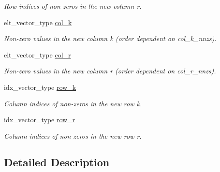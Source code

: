 \begin{DoxyCompactItemize}
\begin{DoxyCompactList}\small\item\em Row indices of non-\/zeros in the new column r. \end{DoxyCompactList}\item 
elt\+\_\+vector\+\_\+type \hyperlink{classswap__struct_a39ab00a67015a67c375b620f54cc6352}{col\+\_\+k}\hypertarget{classswap__struct_a39ab00a67015a67c375b620f54cc6352}{}\label{classswap__struct_a39ab00a67015a67c375b620f54cc6352}

\begin{DoxyCompactList}\small\item\em Non-\/zero values in the new column k (order dependent on col\+\_\+k\+\_\+nnzs). \end{DoxyCompactList}\item 
elt\+\_\+vector\+\_\+type \hyperlink{classswap__struct_a3803a938141694098700de00d5cb6a7d}{col\+\_\+r}\hypertarget{classswap__struct_a3803a938141694098700de00d5cb6a7d}{}\label{classswap__struct_a3803a938141694098700de00d5cb6a7d}

\begin{DoxyCompactList}\small\item\em Non-\/zero values in the new column r (order dependent on col\+\_\+r\+\_\+nnzs). \end{DoxyCompactList}\item 
idx\+\_\+vector\+\_\+type \hyperlink{classswap__struct_a52180e1635646cd4f2dab0209ae62cb9}{row\+\_\+k}\hypertarget{classswap__struct_a52180e1635646cd4f2dab0209ae62cb9}{}\label{classswap__struct_a52180e1635646cd4f2dab0209ae62cb9}

\begin{DoxyCompactList}\small\item\em Column indices of non-\/zeros in the new row k. \end{DoxyCompactList}\item 
idx\+\_\+vector\+\_\+type \hyperlink{classswap__struct_a3b6ad04f7393ddd5c8b130e33208d427}{row\+\_\+r}\hypertarget{classswap__struct_a3b6ad04f7393ddd5c8b130e33208d427}{}\label{classswap__struct_a3b6ad04f7393ddd5c8b130e33208d427}

\begin{DoxyCompactList}\small\item\em Column indices of non-\/zeros in the new row r. \end{DoxyCompactList}\end{DoxyCompactItemize}


\subsection{Detailed Description}
